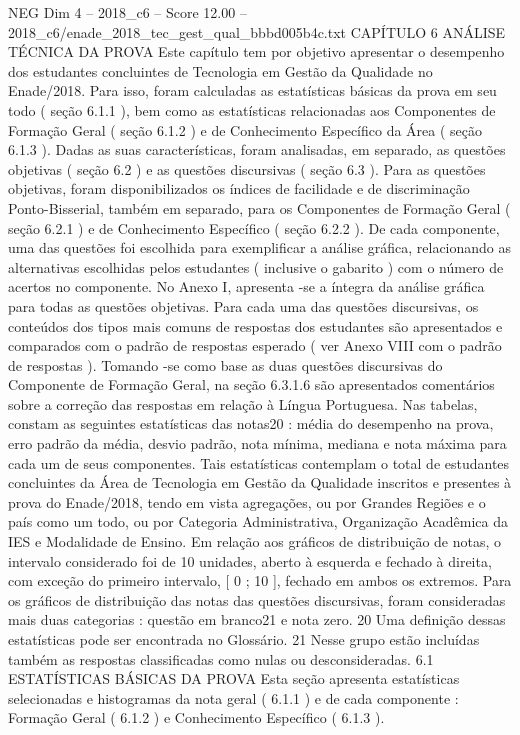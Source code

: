 \begin{textsample}{NEG Dim 4 – 2018\_c6 – Score 12.00 – 2018\_c6/enade\_2018\_tec\_gest\_qual\_bbbd005b4c.txt}  \label{ex:f4_neg_347}
CAPÍTULO 6 ANÁLISE TÉCNICA DA PROVA Este capítulo tem por objetivo apresentar o desempenho dos estudantes concluintes de Tecnologia em Gestão da Qualidade no Enade/2018.
Para isso, foram calculadas as estatísticas básicas da prova em seu todo ( seção 6.1.1 ), bem como as estatísticas relacionadas aos Componentes de Formação Geral ( seção 6.1.2 ) e de Conhecimento Específico da Área ( seção 6.1.3 ).
Dadas as suas características, foram analisadas, em separado, as questões objetivas ( seção 6.2 ) e as questões discursivas ( seção 6.3 ).
Para as questões objetivas, foram disponibilizados os índices de facilidade e de discriminação Ponto-Bisserial, também em separado, para os Componentes de Formação Geral ( seção 6.2.1 ) e de Conhecimento Específico ( seção 6.2.2 ).
De cada componente, uma das questões foi escolhida para exemplificar a análise gráfica, relacionando as alternativas escolhidas pelos estudantes ( inclusive o gabarito ) com o número de acertos no componente.
No Anexo I, apresenta -se a íntegra da análise gráfica para todas as questões objetivas.
Para cada uma das questões discursivas, os conteúdos dos tipos mais comuns de respostas dos estudantes são apresentados e comparados com o padrão de respostas esperado ( ver Anexo VIII com o padrão de respostas ).
Tomando -se como base as duas questões discursivas do Componente de Formação Geral, na seção 6.3.1.6 são apresentados comentários sobre a correção das respostas em relação à Língua Portuguesa.
Nas tabelas, constam as seguintes estatísticas das notas20 : média do desempenho na prova, erro padrão da média, desvio padrão, nota mínima, mediana e nota máxima para cada um de seus componentes.
Tais estatísticas contemplam o total de estudantes concluintes da Área de Tecnologia em Gestão da Qualidade inscritos e presentes à prova do Enade/2018, tendo em vista agregações, ou por Grandes Regiões e o país como um todo, ou por Categoria Administrativa, Organização Acadêmica da IES e Modalidade de Ensino.
Em relação aos gráficos de distribuição de notas, o intervalo considerado foi de 10 unidades, aberto à esquerda e fechado à direita, com exceção do primeiro intervalo, [ 0 ; 10 ], fechado em ambos os extremos.
Para os gráficos de distribuição das notas das questões discursivas, foram consideradas mais duas categorias : questão em branco21 e nota zero. 20 Uma definição dessas estatísticas pode ser encontrada no Glossário. 21 Nesse grupo estão incluídas também as respostas classificadas como nulas ou desconsideradas. 6.1 ESTATÍSTICAS BÁSICAS DA PROVA Esta seção apresenta estatísticas selecionadas e histogramas da nota geral ( 6.1.1 ) e de cada componente : Formação Geral ( 6.1.2 ) e Conhecimento Específico ( 6.1.3 ).

\end{textsample}
